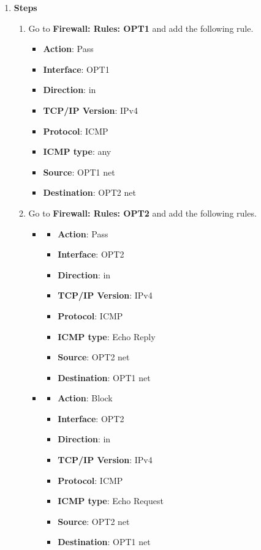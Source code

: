 \documentclass[12pt, a4paper]{article}
\begin{document}
\begin{enumerate}[resume]
    \pagebreak
    \item
    \textbf{Steps}
    \begin{enumerate}
      \item Go to \textbf{Firewall: Rules: OPT1} and add the following rule.
      \begin{itemize}
        \item \textbf{Action}: Pass
        \item \textbf{Interface}: OPT1
        \item \textbf{Direction}: in
        \item \textbf{TCP/IP Version}: IPv4
        \item \textbf{Protocol}: ICMP
        \item \textbf{ICMP type}: any
        \item \textbf{Source}: OPT1 net
        \item \textbf{Destination}: OPT2 net
      \end{itemize}
      \item Go to \textbf{Firewall: Rules: OPT2} and add the following rules.
      \begin{itemize}
        \item
        \begin{itemize}
          \item \textbf{Action}: Pass
          \item \textbf{Interface}: OPT2
          \item \textbf{Direction}: in
          \item \textbf{TCP/IP Version}: IPv4
          \item \textbf{Protocol}: ICMP
          \item \textbf{ICMP type}: Echo Reply
          \item \textbf{Source}: OPT2 net
          \item \textbf{Destination}: OPT1 net
        \end{itemize}
        \item
        \begin{itemize}
          \item \textbf{Action}: Block
          \item \textbf{Interface}: OPT2
          \item \textbf{Direction}: in
          \item \textbf{TCP/IP Version}: IPv4
          \item \textbf{Protocol}: ICMP
          \item \textbf{ICMP type}: Echo Request
          \item \textbf{Source}: OPT2 net
          \item \textbf{Destination}: OPT1 net
        \end{itemize}
      \end{itemize}
    \end{enumerate}


\end{enumerate}
\end{document}
